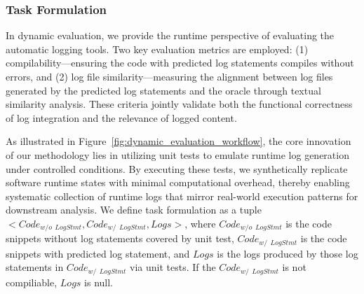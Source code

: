 \subsubsection{Task Formulation}
In dynamic evaluation, we provide the runtime perspective of evaluating the automatic logging tools. 
Two key evaluation metrics are employed: (1) compilability—ensuring the code with predicted log statements compiles without errors, and (2) log file similarity—measuring the alignment between log files generated by the predicted log statements and the oracle through textual similarity analysis. These criteria jointly validate both the functional correctness of log integration and the relevance of logged content.

As illustrated in Figure~\ref{fig:dynamic_evaluation_workflow}, the core innovation of our methodology lies in utilizing unit tests to emulate runtime log generation under controlled conditions. By executing these tests, we synthetically replicate software runtime states with minimal computational overhead, thereby enabling systematic collection of runtime logs that mirror real-world execution patterns for downstream analysis.
We define task formulation as a tuple \(<Code_{w/o\ \ LogStmt}, Code_{w/\ \ LogStmt}, Logs>\), where \(Code_{w/o\ \ LogStmt}\) is the code snippets without log statements covered by unit test, \(Code_{w/\ \ LogStmt}\) is the code snippets with predicted log statement, and \(Logs\) is the logs produced by those log statements in \(Code_{w/\ \ LogStmt}\) via unit tests. If the \(Code_{w/\ \ LogStmt}\) is not compiliable, \(Logs\) is null.

